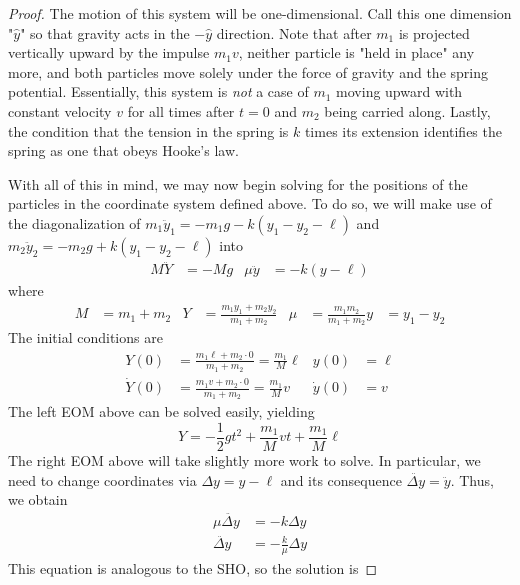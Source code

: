\documentclass[../psets.tex]{subfiles}
\begin{document}
\begin{enumerate}
\begin{proof}
        The motion of this system will be one-dimensional. Call this one dimension "$\hat{y}$" so that gravity acts in the $-\hat{y}$ direction. Note that after $m_1$ is projected vertically upward by the impulse $m_1v$, neither particle is "held in place" any more, and both particles move solely under the force of gravity and the spring potential. Essentially, this system is \emph{not} a case of $m_1$ moving upward with constant velocity $v$ for all times after $t=0$ and $m_2$ being carried along. Lastly, the condition that the tension in the spring is $k$ times its extension identifies the spring as one that obeys Hooke's law.\par
        With all of this in mind, we may now begin solving for the positions of the particles in the coordinate system defined above. To do so, we will make use of the diagonalization of $m_1\ddot{y}_1=-m_1g-k(y_1-y_2-\ell)$ and $m_2\ddot{y}_2=-m_2g+k(y_1-y_2-\ell)$ into
        \begin{align*}
            M\ddot{Y} &= -Mg&
            \mu\ddot{y} &= -k(y-\ell)
        \end{align*}
        where
        \begin{align*}
            M &= m_1+m_2&
            Y &= \frac{m_1y_1+m_2y_2}{m_1+m_2}&
            \mu &= \frac{m_1m_2}{m_1+m_2}
            y &= y_1-y_2
        \end{align*}
        The initial conditions are
        \begin{align*}
            Y(0) &= \frac{m_1\ell+m_2\cdot 0}{m_1+m_2} = \frac{m_1}{M}\ell&
                y(0) &= \ell\\
            \dot{Y}(0) &= \frac{m_1v+m_2\cdot 0}{m_1+m_2} = \frac{m_1}{M}v&
                \dot{y}(0) &= v
        \end{align*}
        The left EOM above can be solved easily, yielding
        \begin{equation*}
            Y = -\frac{1}{2}gt^2+\frac{m_1}{M}vt+\frac{m_1}{M}\ell
        \end{equation*}
        The right EOM above will take slightly more work to solve. In particular, we need to change coordinates via $\Delta y=y-\ell$ and its consequence $\ddot{\Delta y}=\ddot{y}$. Thus, we obtain
        \begin{align*}
            \mu\ddot{\Delta y} &= -k\Delta y\\
            \ddot{\Delta y} &= -\frac{k}{\mu}\Delta y
        \end{align*}
        This equation is analogous to the SHO, so the solution is

\end{proof}
\end{enumerate}
\end{document}
